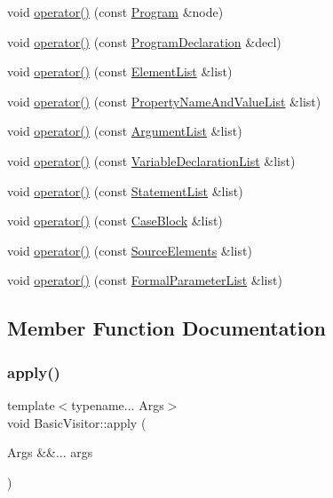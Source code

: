 \begin{DoxyCompactItemize}
\item 
void \hyperlink{struct_basic_visitor_ad36bb57f0b62f1b48cf7ed4b0c6d378b}{operator()} (const \hyperlink{struct_program}{Program} \&node)
\item 
void \hyperlink{struct_basic_visitor_a2ea35a5ede761a22479ba2be10ad0902}{operator()} (const \hyperlink{struct_program_declaration}{Program\+Declaration} \&decl)
\item 
void \hyperlink{struct_basic_visitor_a64c63caf3fbe79ccee28cbec4d2c6144}{operator()} (const \hyperlink{struct_element_list}{Element\+List} \&list)
\item 
void \hyperlink{struct_basic_visitor_a5898e5cdfd0c7802141a035d7563da36}{operator()} (const \hyperlink{struct_property_name_and_value_list}{Property\+Name\+And\+Value\+List} \&list)
\item 
void \hyperlink{struct_basic_visitor_af813d137040199512b862ee280990e16}{operator()} (const \hyperlink{struct_argument_list}{Argument\+List} \&list)
\item 
void \hyperlink{struct_basic_visitor_a210a39743aacc9903d45fe86e8aa72a5}{operator()} (const \hyperlink{struct_variable_declaration_list}{Variable\+Declaration\+List} \&list)
\item 
void \hyperlink{struct_basic_visitor_a08f93ca22b6ff855deb2b1d6343123b5}{operator()} (const \hyperlink{struct_statement_list}{Statement\+List} \&list)
\item 
void \hyperlink{struct_basic_visitor_afc8e6a4fa1e993522b484308d3b1378d}{operator()} (const \hyperlink{struct_case_block}{Case\+Block} \&list)
\item 
void \hyperlink{struct_basic_visitor_a350c9cf47d068cb7de9f4e4a92c07fc8}{operator()} (const \hyperlink{struct_source_elements}{Source\+Elements} \&list)
\item 
void \hyperlink{struct_basic_visitor_ad8960cea4118164c4c913b2b3a42ec4a}{operator()} (const \hyperlink{struct_formal_parameter_list}{Formal\+Parameter\+List} \&list)
\end{DoxyCompactItemize}


\subsection{Member Function Documentation}
\mbox{\label{struct_basic_visitor_a85afee760b9e02733ed01ff56a96f09c}} 
\subsubsection{\texorpdfstring{apply()}{apply()}}
{\footnotesize\ttfamily template$<$typename... Args$>$ \\
void Basic\+Visitor\+::apply (\begin{DoxyParamCaption}\item[{Args \&\&...}]{args }\end{DoxyParamCaption})\hspace{0.3cm}{\ttfamily [inline]}}


